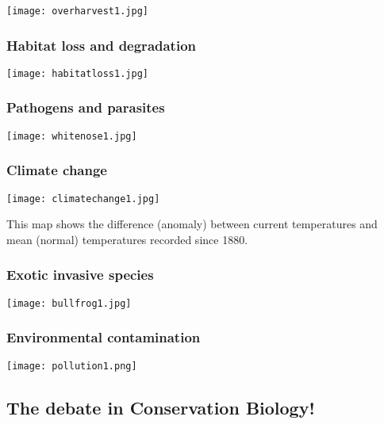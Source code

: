 \documentclass[
]{article}
\begin{document}
\texttt{[image: overharvest1.jpg]}

\hypertarget{habitat-loss-and-degradation}{%
\subsubsection{Habitat loss and
degradation}\label{habitat-loss-and-degradation}}

\texttt{[image: habitatloss1.jpg]}

\hypertarget{pathogens-and-parasites}{%
\subsubsection{Pathogens and parasites}\label{pathogens-and-parasites}}

\texttt{[image: whitenose1.jpg]}

\hypertarget{climate-change}{%
\subsubsection{Climate change}\label{climate-change}}

\texttt{[image: climatechange1.jpg]}

This map shows the difference (anomaly) between current temperatures and
mean (normal) temperatures recorded since 1880.

\hypertarget{exotic-invasive-species}{%
\subsubsection{Exotic invasive species}\label{exotic-invasive-species}}

\texttt{[image: bullfrog1.jpg]}

\hypertarget{environmental-contamination}{%
\subsubsection{Environmental
contamination}\label{environmental-contamination}}

\texttt{[image: pollution1.png]}

\hypertarget{the-debate-in-conservation-biology}{%
\subsection{The debate in Conservation
Biology!}\label{the-debate-in-conservation-biology}}
\end{document}
